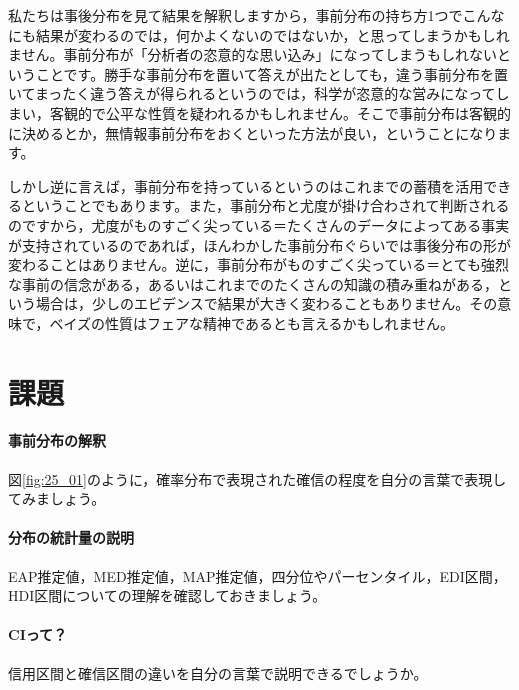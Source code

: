 \documentclass{ltjsbook}
\begin{document}
私たちは事後分布を見て結果を解釈しますから，事前分布の持ち方1つでこんなにも結果が変わるのでは，何かよくないのではないか，と思ってしまうかもしれません。事前分布が「分析者の恣意的な思い込み」になってしまうもしれないということです。勝手な事前分布を置いて答えが出たとしても，違う事前分布を置いてまったく違う答えが得られるというのでは，科学が恣意的な営みになってしまい，客観的で公平な性質を疑われるかもしれません。そこで事前分布は客観的に決めるとか，無情報事前分布をおくといった方法が良い，ということになります。

しかし逆に言えば，事前分布を持っているというのはこれまでの蓄積を活用できるということでもあります。また，事前分布と尤度が掛け合わされて判断されるのですから，尤度がものすごく尖っている＝たくさんのデータによってある事実が支持されているのであれば，ほんわかした事前分布ぐらいでは事後分布の形が変わることはありません。逆に，事前分布がものすごく尖っている＝とても強烈な事前の信念がある，あるいはこれまでのたくさんの知識の積み重ねがある，という場合は，少しのエビデンスで結果が大きく変わることもありません。その意味で，ベイズの性質はフェアな精神であるとも言えるかもしれません。


\section{課題}
\paragraph{事前分布の解釈}図\ref{fig:25_01}のように，確率分布で表現された確信の程度を自分の言葉で表現してみましょう。
\paragraph{分布の統計量の説明}EAP推定値，MED推定値，MAP推定値，四分位やパーセンタイル，EDI区間，HDI区間についての理解を確認しておきましょう。
\paragraph{CIって？}信用区間と確信区間の違いを自分の言葉で説明できるでしょうか。
\end{document}
